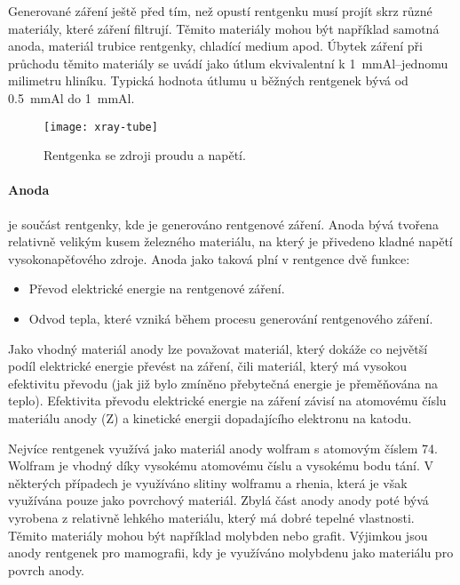 Generované záření ještě před tím, než opustí rentgenku musí projít skrz různé materiály, které záření filtrují. Těmito materiály mohou být například samotná anoda, materiál trubice rentgenky, chladící medium apod. Úbytek záření při průchodu těmito materiály se uvádí jako útlum ekvivalentní k \SI{1}{\mm}Al--jednomu milimetru hliníku. Typická hodnota útlumu u běžných rentgenek bývá od \SI{0.5}{\mm}Al do \SI{1}{\mm}Al. 

\begin{figure}[hb]
\texttt{[image: xray-tube]}
\caption{Rentgenka se zdroji proudu a napětí. \cite[str. 93]{Diagnostic-Radiology-Physics}}
\label{fig:xray-tube}
\centering
\end{figure}

\paragraph{Anoda}
je součást rentgenky, kde je generováno rentgenové záření. Anoda bývá tvořena relativně velikým kusem železného materiálu, na který je přivedeno kladné napětí vysokonapěťového zdroje. Anoda jako taková plní v rentgence dvě funkce:
\begin{itemize}
\item Převod elektrické energie na rentgenové záření.
\item Odvod tepla, které vzniká během procesu generování rentgenového záření.
\end{itemize}
Jako vhodný materiál anody lze považovat materiál, který dokáže co největší podíl elektrické energie převést na záření, čili materiál, který má vysokou efektivitu převodu (jak již bylo zmíněno přebytečná energie je přeměňována na teplo). Efektivita převodu elektrické energie na záření závisí na atomovému číslu materiálu anody (Z) a kinetické energii dopadajícího elektronu na katodu.\cite{The-Physical-Principles-of-Medical-Imaging}

Nejvíce rentgenek využívá jako materiál anody wolfram s atomovým číslem 74. Wolfram je vhodný díky vysokému atomovému číslu a vysokému bodu tání. V některých případech je využíváno slitiny wolframu a rhenia, která je však využívána pouze jako povrchový materiál. Zbylá část anody anody poté bývá vyrobena z relativně lehkého materiálu, který má dobré tepelné vlastnosti. Těmito materiály mohou být například molybden nebo grafit. Výjimkou jsou anody rentgenek pro mamografii, kdy je využíváno molybdenu jako materiálu pro povrch anody.\cite{The-Physical-Principles-of-Medical-Imaging}

